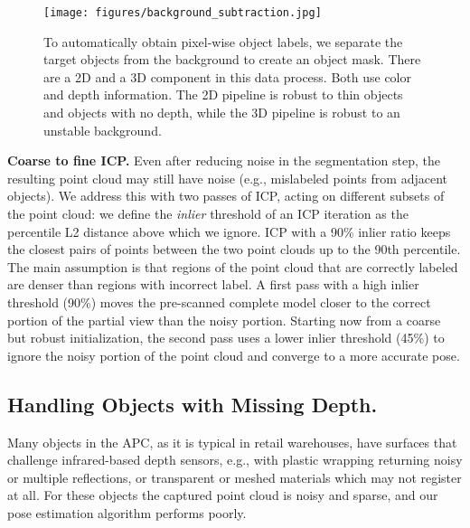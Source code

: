 \documentclass[letterpaper, 10 pt, conference]{ieeeconf}  %
\newcommand{\myparagraph}[1]{\vspace{0.1in}\noindent\textbf{#1}}
\begin{document}
\begin{figure}[t]
\vspace{2mm}
\centering
  \texttt{[image: figures/background\_subtraction.jpg]}
  \vspace{-1mm}
  \caption{To automatically obtain pixel-wise object labels, we separate the target objects from the background to create an object mask. There are a 2D and a 3D component in this data process. Both use color and depth information. The 2D pipeline is robust to thin objects and objects with no depth, while the 3D pipeline is robust to an unstable background. 
  }
\vspace{-4mm}
\end{figure}

\myparagraph{Coarse to fine ICP.}
Even after reducing noise in the segmentation step, the resulting point cloud may still have noise (e.g., mislabeled points from adjacent objects). We address this with two passes of ICP, acting on different subsets of the point cloud: we define the \emph{inlier} threshold of an ICP iteration as the percentile L2 distance above which we ignore. ICP with a 90\% inlier ratio keeps the closest pairs of points between the two point clouds up to the 90th percentile.
The main assumption is that regions of the point cloud that are correctly labeled are denser than regions with incorrect label. A first pass with a high inlier threshold (90\%) moves the pre-scanned complete model closer to the correct portion of the partial view than the noisy portion. 
Starting now from a coarse but robust initialization, the second pass uses a lower inlier threshold (45\%) to ignore the noisy portion of the point cloud and converge to a more accurate pose.




\subsection{Handling Objects with Missing Depth.}
Many objects in the APC, as it is typical in retail warehouses, have surfaces that challenge infrared-based depth sensors, e.g., with plastic wrapping returning noisy or multiple reflections, or transparent or meshed materials which may not register at all. For these objects the captured point cloud is noisy and sparse, and our pose estimation algorithm performs poorly.
\end{document}

